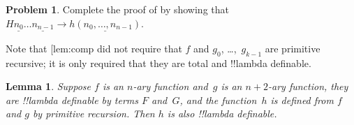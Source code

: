 \documentclass[10pt,a4paper]{article}
\makeatletter
\theoremstyle{plain}
\newtheorem{lem}[thm]{Lemma}
\theoremstyle{definition}
\newtheorem{prob}{Problem}[section]
\theoremstyle{remark}
\newcommand*{\ollabel}[1]{\label{#1}}
\newcommand{\olref}{\@ifnextchar[{\olref@i}{\olref@final}}
\def\olref@i[#1]{\@ifnextchar[{\olref@ii}{\olref@final}}
\def\olref@ii[#1]{\@ifnextchar[{\olref@iii}{\olref@final}}
\def\olref@iii[#1]{\olref@final}
\def\olref@final#1{\ref{#1}}
\providecommand{\num}[1]{\underline{#1}}
\providecommand{\red}{\mathrel{\rightarrow}}
\makeatother
\begin{document}
\begin{prob}
  Complete the proof of \olref[lam][ldf][prf]{lem:comp} by showing
  that $H\num{n_0}\dots\num{n_{n-1}} \red \num{h(n_0, \dots,
    n_{n-1})}$.
\end{prob}

Note that \olref{lem:comp} did not require that $f$ and $g_0$,
\dots,~$g_{k-1}$ are primitive recursive; it is only required that
they are total and !!{lambda definable}.

\begin{lem}\ollabel{lem:prim}
  Suppose $f$ is an $n$-ary function and~$g$ is an $n+2$-ary function,
  they are !!{lambda definable} by terms $F$ and~$G$, and the
  function~$h$ is defined from $f$ and $g$ by primitive
  recursion. Then $h$ is also !!{lambda definable}.
\end{lem}
\end{document}
